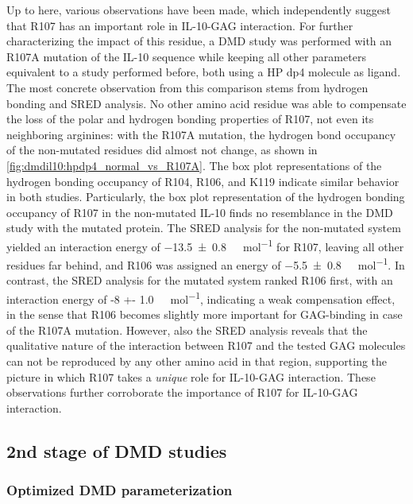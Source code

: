 Up to here, various observations have been made, which independently suggest
that R107 has an important role in IL-10-GAG interaction. For further
characterizing the impact of this residue, a DMD study was performed with an
R107A mutation of the IL-10 sequence while keeping all other parameters
equivalent to a study performed before, both using a HP dp4 molecule as ligand.
The most concrete observation from this comparison stems from hydrogen bonding
and SRED analysis. No other amino acid residue was able to compensate the loss
of the polar and hydrogen bonding properties of R107, not even its neighboring
arginines: with the R107A mutation, the hydrogen bond occupancy of the
non-mutated residues did almost not change, as shown in
\cref{fig:dmdil10:hpdp4_normal_vs_R107A}. The box plot representations of the
hydrogen bonding occupancy of R104, R106, and K119 indicate similar behavior in
both studies. Particularly, the box plot representation of the hydrogen bonding
occupancy of R107 in the non-mutated IL-10 finds no resemblance in the DMD study
with the mutated protein. The SRED analysis for the non-mutated system yielded
an interaction energy of \SI{-13.5 +- 0.8}{\kilo\calory\per\mol} for R107,
leaving all other residues far behind, and R106 was assigned an energy of
\SI{-5.5 +- 0.8}{\kilo\calory\per\mol}. In contrast, the SRED analysis for the
mutated system ranked R106 first, with an interaction energy of \SI{-8 +-
1.0}{\kilo\calory\per\mol}, indicating a weak compensation effect, in the sense
that R106 becomes slightly more important for GAG-binding in case of the R107A
mutation. However, also the SRED analysis reveals that the qualitative nature of
the interaction between R107 and the tested GAG molecules can not be reproduced
by any other amino acid in that region, supporting the picture in which R107
takes a \textit{unique} role for IL-10-GAG interaction. These observations
further corroborate the importance of R107 for IL-10-GAG interaction.


\subsection{2nd stage of DMD studies}
\label{dmdil10:2ndstageresults}

\subsubsection{Optimized DMD parameterization}
\label{dmdil10:method_setup_2nd}


